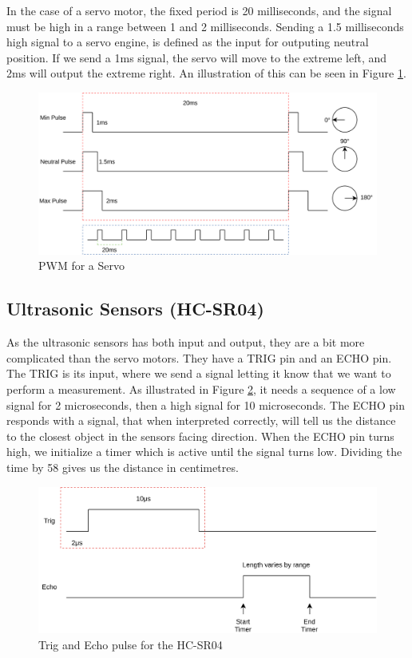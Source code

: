 \documentclass{article}
\begin{document}
In the case of a servo motor, the fixed period is 20 milliseconds, and the signal must be high in a range between 1 and 2 milliseconds. Sending a 1.5 milliseconds high signal to a servo engine, is defined as the input for outputing neutral position. If we send a 1ms signal, the servo will move to the extreme left, and 2ms will output the extreme right. An illustration of this can be seen in Figure \ref{servo}.

\begin{figure}[H]
	\centering
	\includegraphics[width=\linewidth]{servo.png}
	\caption{PWM for a Servo}
	\label{servo}
\end{figure}

\subsection{Ultrasonic Sensors (HC-SR04)}
As the ultrasonic sensors has both input and output, they are a bit more complicated than the servo motors. They have a TRIG pin and an ECHO pin.\\

The TRIG is its input, where we send a signal letting it know that we want to perform a measurement. As illustrated in Figure \ref{ultrasonic-sensor}, it needs a sequence of a low signal for 2 microseconds, then a high signal for 10 microseconds. The ECHO pin responds with a signal, that when interpreted correctly, will tell us the distance to the closest object in the sensors facing direction. When the ECHO pin turns high, we initialize a timer which is active until the signal turns low. Dividing the time by 58 gives us the distance in centimetres.\\

\begin{figure}[H]
	\centering
	\includegraphics[width=\linewidth]{ultrasonic-sensor.png}
	\caption{Trig and Echo pulse for the HC-SR04}
	\label{ultrasonic-sensor}
\end{figure}
\end{document}
